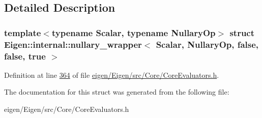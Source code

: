 \subsection{Detailed Description}
\subsubsection*{template$<$typename Scalar, typename Nullary\+Op$>$\newline
struct Eigen\+::internal\+::nullary\+\_\+wrapper$<$ Scalar, Nullary\+Op, false, false, true $>$}



Definition at line \hyperlink{eigen_2_eigen_2src_2_core_2_core_evaluators_8h_source_l00364}{364} of file \hyperlink{eigen_2_eigen_2src_2_core_2_core_evaluators_8h_source}{eigen/\+Eigen/src/\+Core/\+Core\+Evaluators.\+h}.



The documentation for this struct was generated from the following file\+:\begin{DoxyCompactItemize}
\item 
eigen/\+Eigen/src/\+Core/\+Core\+Evaluators.\+h\end{DoxyCompactItemize}
